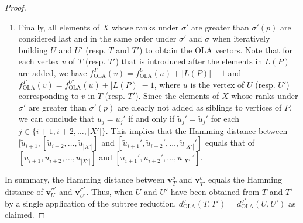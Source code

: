 \documentclass{article}
\newcommand{\OLA}{\mathrm{OLA}}
\begin{document}
\begin{proof}
\begin{enumerate}[label={\upshape(\roman*)}]
            \item Finally, all elements of $X$ whose ranks under $\sigma'$ are greater than $\sigma'(p)$ are considered last and in the same order under $\sigma'$ and $\sigma$ when iteratively building $U$ and $U'$ (resp. $T$ and $T'$) to obtain the OLA vectors. Note that for each vertex $v$ of $T$ (resp. $T'$) that is introduced after the elements in $L(P)$ are added, we have $f^T_\OLA(v) = f^{U}_\OLA(u) + |L(P)|-1$ and $f^{T'}_\OLA(v) = f^{U'}_\OLA(u) + |L(P)|-1$, where $u$ is the vertex of $U$ (resp. $U'$) corresponding to $v$ in $T$ (resp. $T'$). Since the elements of $X$ whose ranks under $\sigma'$ are greater than $\sigma'(p)$ are clearly not added as siblings to vertices of $P$, we can conclude that $u_j = u_j'$ if and only if $\widetilde{u}_j' = \widetilde{u}_j'$ for each $j \in \{i+1,i+2,\ldots, |X'|\}$.  This implies that the Hamming distance between $[\widetilde{u}_{i+1},[\widetilde{u}_{i+2}, \ldots, \widetilde{u}_{|X'|}]$ and $[\widetilde{u}_{i+1}',\widetilde{u}_{i+2}', \ldots, \widetilde{u}_{|X'|}']$ equals that of $[u_{i+1},u_{i+2}, \ldots, u_{|X'|}]$ and  $[u_{i+1}', u_{i+2}', \ldots, u_{|X'|}']$.

        \end{enumerate} 
    In summary, the Hamming distance between $\mathbf{v}^{\sigma}_T$ and $\mathbf{v}^{\sigma}_{T'}$ equals the Hamming distance of $\mathbf{v}^{\sigma'}_U$ and $\mathbf{v}^{\sigma'}_{U'}$. Thus, when $U$ and $U'$ have been obtained from $T$ and $T'$ by a single application of the subtree reduction, $d^{\sigma}_\OLA(T,T') = d^{\sigma'}_\OLA(U,U')$ as claimed.


\end{proof}
\end{document}
